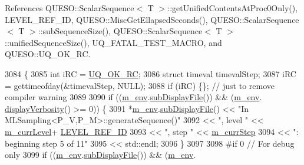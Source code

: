 References Q\-U\-E\-S\-O\-::\-Scalar\-Sequence$<$ T $>$\-::get\-Unified\-Contents\-At\-Proc0\-Only(), L\-E\-V\-E\-L\-\_\-\-R\-E\-F\-\_\-\-I\-D, Q\-U\-E\-S\-O\-::\-Misc\-Get\-Ellapsed\-Seconds(), Q\-U\-E\-S\-O\-::\-Scalar\-Sequence$<$ T $>$\-::sub\-Sequence\-Size(), Q\-U\-E\-S\-O\-::\-Scalar\-Sequence$<$ T $>$\-::unified\-Sequence\-Size(), U\-Q\-\_\-\-F\-A\-T\-A\-L\-\_\-\-T\-E\-S\-T\-\_\-\-M\-A\-C\-R\-O, and Q\-U\-E\-S\-O\-::\-U\-Q\-\_\-\-O\-K\-\_\-\-R\-C.


\begin{DoxyCode}
3084 \{
3085   \textcolor{keywordtype}{int} iRC = \hyperlink{namespace_q_u_e_s_o_a8e909502900aecf24cedba022ea84471}{UQ\_OK\_RC};
3086   \textcolor{keyword}{struct }timeval timevalStep;
3087   iRC = gettimeofday(&timevalStep, NULL);
3088   \textcolor{keywordflow}{if} (iRC) \{\}; \textcolor{comment}{// just to remove compiler warning}
3089 
3090       \textcolor{keywordflow}{if} ((\hyperlink{class_q_u_e_s_o_1_1_m_l_sampling_a13f1ca4fe9f94822fe572a743eaced1d}{m\_env}.\hyperlink{class_q_u_e_s_o_1_1_base_environment_a8a0064746ae8dddfece4229b9ad374d6}{subDisplayFile}()) && (\hyperlink{class_q_u_e_s_o_1_1_m_l_sampling_a13f1ca4fe9f94822fe572a743eaced1d}{m\_env}.
      \hyperlink{class_q_u_e_s_o_1_1_base_environment_a1fe5f244fc0316a0ab3e37463f108b96}{displayVerbosity}() >= 0)) \{
3091         *\hyperlink{class_q_u_e_s_o_1_1_m_l_sampling_a13f1ca4fe9f94822fe572a743eaced1d}{m\_env}.\hyperlink{class_q_u_e_s_o_1_1_base_environment_a8a0064746ae8dddfece4229b9ad374d6}{subDisplayFile}() << \textcolor{stringliteral}{"In MLSampling<P\_V,P\_M>::generateSequence()"}
3092                                 << \textcolor{stringliteral}{", level "} << \hyperlink{class_q_u_e_s_o_1_1_m_l_sampling_af9416874c856e50f3b35270e801f17e4}{m\_currLevel}+
      \hyperlink{_m_l_sampling_level_options_8h_a68d15eaf394d210effcf584b938206d3}{LEVEL\_REF\_ID}
3093                                 << \textcolor{stringliteral}{", step "}  << \hyperlink{class_q_u_e_s_o_1_1_m_l_sampling_a1b1f8ccb4823bdfa26ec652f0807c63e}{m\_currStep}
3094                                 << \textcolor{stringliteral}{": beginning step 5 of 11"}
3095                                 << std::endl;
3096       \}
3097 
3098 \textcolor{preprocessor}{#if 0 // For debug only}
3099 \textcolor{preprocessor}{}      \textcolor{keywordflow}{if} ((\hyperlink{class_q_u_e_s_o_1_1_m_l_sampling_a13f1ca4fe9f94822fe572a743eaced1d}{m\_env}.\hyperlink{class_q_u_e_s_o_1_1_base_environment_a8a0064746ae8dddfece4229b9ad374d6}{subDisplayFile}()) && (\hyperlink{class_q_u_e_s_o_1_1_m_l_sampling_a13f1ca4fe9f94822fe572a743eaced1d}{m\_env}.

\end{DoxyCode}
